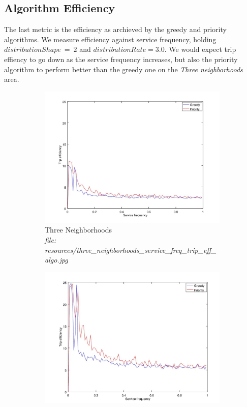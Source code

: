 \documentclass{article}
\begin{document}
		\subsection{Algorithm Efficiency}
		The last metric is the efficiency as archieved by the greedy and priority algorithms. We measure efficiency
		against service frequency, holding $distributionShape\ =\ 2$ and  $distributionRate = 3.0$. We would expect 
		trip effiency to go down as the service frequency increases, but also the priority algorithm to perform better
		than the greedy one on the \textit{Three neighborhoods} area.

		\begin{figure}[H]
			\centering
			\begin{subfigure}[b]{.5\textwidth}
				\includegraphics[width=\textwidth]{resources/three_neighborhoods_service_freq_trip_eff_algo.jpg}
				\caption{Three Neighborhoods \\\textit{file: resources/three\_neighborhoods\_service\_freq\_trip\_eff\_algo.jpg}}
				\label{fig:fig9a}
			\end{subfigure}\hfill%
			\begin{subfigure}[b]{.5\textwidth}
				\includegraphics[width=\textwidth]{resources/big_cluster_service_freq_trip_eff_algo.jpg}

\end{subfigure}
\end{figure}
\end{document}
